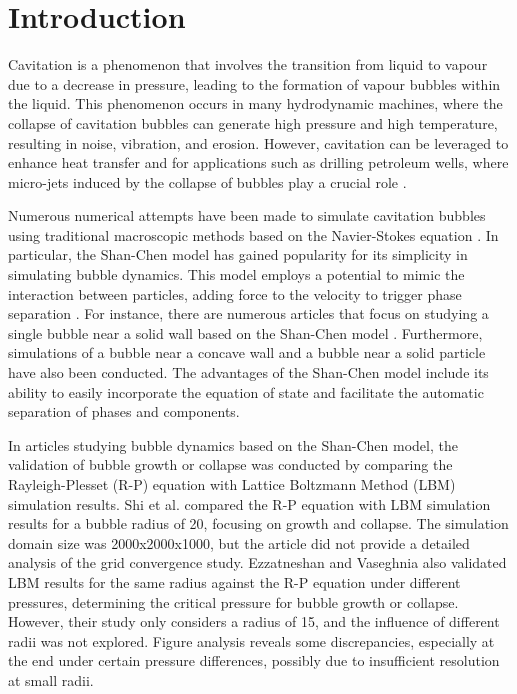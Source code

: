 \documentclass[review]{elsarticle}
\begin{document}
\linenumbers

\section{Introduction}
Cavitation is a phenomenon that involves the transition from liquid to vapour due to a decrease in pressure, leading to the formation of vapour bubbles within the liquid. This phenomenon occurs in many hydrodynamic machines, where the collapse of cavitation bubbles can generate high pressure and high temperature, resulting in noise, vibration, and erosion. However, cavitation can be leveraged to enhance heat transfer and for applications such as drilling petroleum wells, where micro-jets induced by the collapse of bubbles play a crucial role \cite{peng2019simulation}.

Numerous numerical attempts have been made to simulate cavitation bubbles using traditional macroscopic methods based on the Navier-Stokes equation \cite{ogloblina2018simulation,shang2022investigation,koch2016numerical}. In particular, the Shan-Chen model has gained popularity for its simplicity in simulating bubble dynamics. This model employs a potential to mimic the interaction between particles, adding force to the velocity to trigger phase separation \cite{yuan2021modelling}. For instance, there are numerous articles that focus on studying a single bubble near a solid wall based on the Shan-Chen model \cite{liu2021study,yxl2020numerical,mao2018study}. Furthermore, simulations of a bubble near a concave wall  and a bubble near a solid particle \cite{peng2020simulation} have also been conducted. The advantages of the Shan-Chen model include its ability to easily incorporate the equation of state and facilitate the automatic separation of phases and components.

In articles studying bubble dynamics based on the Shan-Chen model, the validation of bubble growth or collapse was conducted by comparing the Rayleigh-Plesset (R-P) equation with Lattice Boltzmann Method (LBM) simulation results. Shi et al. \cite{shi2020numerical} compared the R-P equation with LBM simulation results for a bubble radius of 20, focusing on growth and collapse. The simulation domain size was 2000x2000x1000, but the article did not provide a detailed analysis of the grid convergence study. Ezzatneshan and Vaseghnia \cite{ezzatneshan2021dynamics} also validated LBM results for the same radius against the R-P equation under different pressures, determining the critical pressure for bubble growth or collapse. However, their study only considers a radius of 15, and the influence of different radii was not explored. Figure analysis reveals some discrepancies, especially at the end under certain pressure differences, possibly due to insufficient resolution at small radii.
\end{document}
